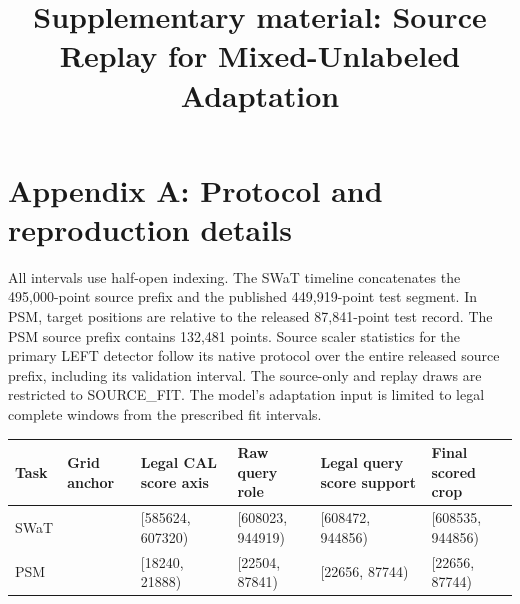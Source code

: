 \documentclass[11pt]{article}
\title{Supplementary material: Source Replay for Mixed-Unlabeled Adaptation}
\author{}
\date{}
\begin{document}
\maketitle
\section{Appendix A: Protocol and reproduction
details}\label{appendix-a-protocol-and-reproduction-details}

All intervals use half-open indexing. The SWaT timeline concatenates the
495,000-point source prefix and the published 449,919-point test
segment. In PSM, target positions are relative to the released
87,841-point test record. The PSM source prefix contains 132,481 points.
Source scaler statistics for the primary LEFT detector follow its native
protocol over the entire released source prefix, including its
validation interval. The source-only and replay draws are restricted to
SOURCE\_FIT. The model's adaptation input is limited to legal complete
windows from the prescribed fit intervals.

\begin{longtable}[]{@{}
  >{\raggedright\arraybackslash}p{}
  >{\raggedleft\arraybackslash}p{}
  >{\raggedright\arraybackslash}p{}
  >{\raggedright\arraybackslash}p{}
  >{\raggedright\arraybackslash}p{}
  >{\raggedright\arraybackslash}p{}@{}}
\toprule\noalign{}
\begin{minipage}[b]{\linewidth}\raggedright
Task
\end{minipage} & \begin{minipage}[b]{\linewidth}\raggedleft
Grid anchor
\end{minipage} & \begin{minipage}[b]{\linewidth}\raggedright
Legal CAL score axis
\end{minipage} & \begin{minipage}[b]{\linewidth}\raggedright
Raw query role
\end{minipage} & \begin{minipage}[b]{\linewidth}\raggedright
Legal query score support
\end{minipage} & \begin{minipage}[b]{\linewidth}\raggedright
Final scored crop
\end{minipage} \\
\midrule\noalign{}
\endhead
\bottomrule\noalign{}
\endlastfoot
SWaT & 495000 & {[}585624, 607320) & {[}608023, 944919) &
{[}608472, 944856) & {[}608535, 944856) \\
PSM & 0 & {[}18240, 21888) & {[}22504, 87841) & {[}22656, 87744) &
{[}22656, 87744) \\
\end{longtable}
\end{document}
